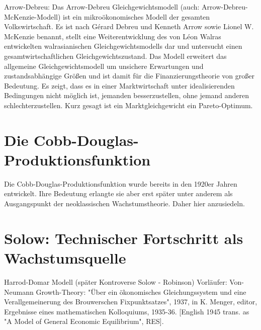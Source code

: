 Arrow-Debreu:
Das Arrow-Debreu Gleichgewichtsmodell (auch: Arrow-Debreu-McKenzie-Modell) ist ein mikroökonomisches Modell der gesamten Volkswirtschaft. Es ist nach Gérard Debreu und Kenneth Arrow sowie Lionel W. McKenzie benannt, stellt eine Weiterentwicklung des von Léon Walras entwickelten walrasianischen Gleichgewichtsmodells dar und untersucht einen gesamtwirtschaftlichen Gleichgewichtszustand. 
Das Modell erweitert das allgemeine Gleichgewichtsmodell um unsichere Erwartungen und zustandsabhängige Größen und ist damit für die Finanzierungstheorie von großer Bedeutung. Es zeigt, dass es in einer Marktwirtschaft unter idealisierenden Bedingungen nicht möglich ist, jemanden besserzustellen, ohne jemand anderen schlechterzustellen. Kurz gesagt ist ein Marktgleichgewicht ein Pareto-Optimum. 



\section{Die Cobb-Douglas-Produktionsfunktion} \label{sec: Cobb-Douglas-Produktionsfunktion}
Die Cobb-Douglas-Produktionsfunktion wurde bereits in den 1920er Jahren entwickelt. Ihre Bedeutung erlangte sie aber erst später unter anderem als Ausgangspunkt der neoklassischen Wachstumstheorie. Daher hier anzusiedeln.



\section{Solow: Technischer Fortschritt als Wachstumsquelle} \label{sec: Solow-Modell}


Harrod-Domar Modell (später Kontroverse Solow - Robinson)
Vorläufer: Von-Neumann Growth-Theory: 
"Über ein ökonomisches Gleichungssystem und eine Verallgemeinerung des Brouwerschen Fixpunktsatzes",  1937, in K. Menger, editor, Ergebnisse eines mathematischen Kolloquiums, 1935-36. [English 1945 trans. as "A Model of General Economic Equilibrium", RES].


